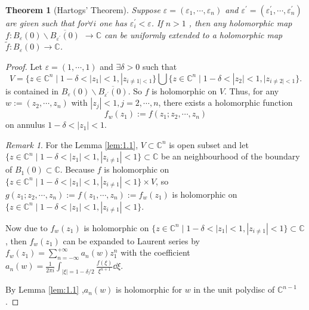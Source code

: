 \documentclass[12pt,twoside]{book}
\theoremstyle{plain}
\newtheorem{theorem}{Theorem}[section]
\theoremstyle{definition}
\theoremstyle{remark}
\newtheorem{remark}[remark]{Remark}
\numberwithin{equation}{section}
\begin{document}
\begin{theorem}[Hartogs' Theorem]
    Suppose $\varepsilon=(\varepsilon_1,\cdots,\varepsilon_n) $ and $\varepsilon^\prime=(\varepsilon_1^\prime,\cdots,\varepsilon_n^\prime)$ are given such that for$\forall i$ one has $\varepsilon_i^\prime <\varepsilon$. If $n>1$ , then any holomorphic map $f\colon  B_\varepsilon (0)\backslash \overline{B_{\varepsilon^\prime}(0)}$ $\to \mathbb{C}$ can be uniformly extended to a holomorphic map $\widetilde{f}: B_\varepsilon(0)\to \mathbb{C}$.
\end{theorem}
\begin{proof}
    Let $\varepsilon=(1,\cdots,1) $ and $\exists\delta>0$ such that 
    \[V=\{z\in \mathbb{C}^n\mid 1-\delta<|z_1|<1,|z_{i\neq 1|<1}\}\bigcup \{z\in \mathbb{C}^n\mid 1-\delta<|z_2|<1,|z_{i\neq 2|<1}\}.\]
    is contained in $B_\varepsilon(0)\backslash\overline{B_{\varepsilon^\prime}(0)}$. So $f$ is holomorphic on $V$. Thus, for any $w := (z_2,\cdots,z_n)$ with $|z_j|<1,j=2,\cdots,n$, there exists a holomorphic function $$f_w(z_1):=f(z_1;z_2,\cdots,z_n)$$ on annulus $1-\delta<|z_1|<1$. 
    \begin{remark}
        For the Lemma \ref{lem:1.1}, $V\subset \mathbb{C}^n$ is open subset and let $\{z\in\mathbb{C}^n\mid 1-\delta<|z_1|<1,|z_{i\neq 1}|<1\}\subset \mathbb{C}$ be an neighbourhood of the boundary of $B_1(0)\subset \mathbb{C}$. Because $f$ is holomorphic on $\{z\in\mathbb{C}^n\mid 1-\delta<|z_1|<1,|z_{i\neq 1}|<1\}\times V$, so $g(z_1;z_2,\cdots,z_n):=f(z_1,\cdots,z_n):=f_w(z_1)$ is holomorphic on $\{z\in\mathbb{C}^n\mid 1-\delta<|z_1|<1,|z_{i\neq 1}|<1\}$. 
    \end{remark}
    Now due to $f_w(z_1)$ is holomorphic on $\{z\in\mathbb{C}^n\mid 1-\delta<|z_1|<1,|z_{i\neq 1}|<1\}\subset \mathbb{C}$, then $f_w(z_1)$ can be expanded to Laurent series by $f_w(z_1)=\sum_{n=-\infty}^{+\infty}a_n (w) z_1 ^n$ with the coefficient $a_n (w)=\frac{1}{2\pi i}\int_{|\xi|=1-\delta/2}\frac{f(\xi)}{\xi^{n+1}}\dd \xi$. 

    By Lemma \ref{lem:1.1} ,$a_n (w)$ is holomorphic for $w$ in the unit polydisc of $\mathbb{C}^{n-1}$.


\end{proof}
\end{document}
